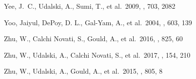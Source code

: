 \documentclass[10pt]{emulateapj}
\begin{document}
\begin{thebibliography}{999}
Yee, J.~C., Udalski, A., Sumi, T., et al.\ 2009, \apj, 703, 2082 

Yoo, Jaiyul, DePoy, D. L., Gal-Yam, A., et al.\ 2004, \apj, 603, 139

Zhu, W., Calchi Novati, S., Gould, A., et al.\ 2016, \apj, 825, 60 

Zhu, W., Udalski, A., Calchi Novati, S., et al.\ 2017, \aj, 154, 210

Zhu, W., Udalski, A., Gould, A., et al.\ 2015, \apj, 805, 8 

\end{thebibliography}
\end{document}
